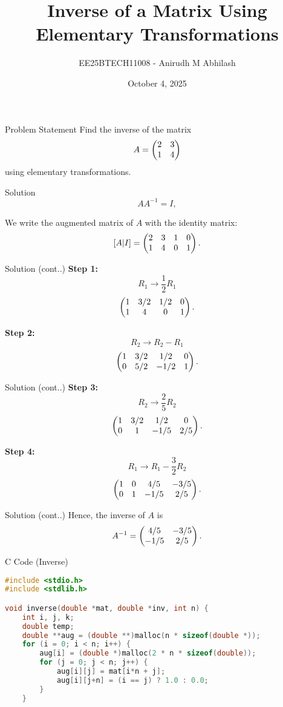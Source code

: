\documentclass{beamer}
\title{Inverse of a Matrix Using Elementary Transformations}
\author{EE25BTECH11008 - Anirudh M Abhilash}
\date{October 4, 2025}
\begin{document}
\begin{frame}
\titlepage
\end{frame}

\begin{frame}{Problem Statement}
Find the inverse of the matrix 
\[
A = \begin{pmatrix}2 & 3 \\ 1 & 4\end{pmatrix}
\]
using elementary transformations.
\end{frame}

\begin{frame}{Solution}
\[
A A^{-1} = I,
\]

We write the augmented matrix of $A$ with the identity matrix:
\[
[A | I] = \begin{pmatrix}2 & 3 & 1 & 0 \\ 1 & 4 & 0 & 1\end{pmatrix}.
\]
\end{frame}

\begin{frame}{Solution (cont..)}
\textbf{Step 1:}
\[
R_1 \to \frac{1}{2} R_1
\]
\[
\begin{pmatrix}1 & 3/2 & 1/2 & 0 \\ 1 & 4 & 0 & 1\end{pmatrix}.
\]

\textbf{Step 2:}
\[
R_2 \to R_2 - R_1
\]
\[
\begin{pmatrix}1 & 3/2 & 1/2 & 0 \\ 0 & 5/2 & -1/2 & 1\end{pmatrix}.
\]
\end{frame}

\begin{frame}{Solution (cont..)}
\textbf{Step 3:}
\[
R_2 \to \frac{2}{5} R_2
\]
\[
\begin{pmatrix}1 & 3/2 & 1/2 & 0 \\ 0 & 1 & -1/5 & 2/5\end{pmatrix}.
\]

\textbf{Step 4:}
\[
R_1 \to R_1 - \frac{3}{2} R_2
\]
\[
\begin{pmatrix}1 & 0 & 4/5 & -3/5 \\ 0 & 1 & -1/5 & 2/5\end{pmatrix}.
\]
\end{frame}

\begin{frame}{Solution (cont..)}
Hence, the inverse of $A$ is
\[
A^{-1} = \begin{pmatrix}4/5 & -3/5 \\ -1/5 & 2/5\end{pmatrix}.
\]
\end{frame}


\begin{frame}[fragile]{C Code (Inverse)}
\begin{lstlisting}[language=C]
#include <stdio.h>
#include <stdlib.h>

void inverse(double *mat, double *inv, int n) {
    int i, j, k;
    double temp;
    double **aug = (double **)malloc(n * sizeof(double *));
    for (i = 0; i < n; i++) {
        aug[i] = (double *)malloc(2 * n * sizeof(double));
        for (j = 0; j < n; j++) {
            aug[i][j] = mat[i*n + j];
            aug[i][j+n] = (i == j) ? 1.0 : 0.0; 
        }
    }
\end{lstlisting}
\end{frame}
\end{document}
